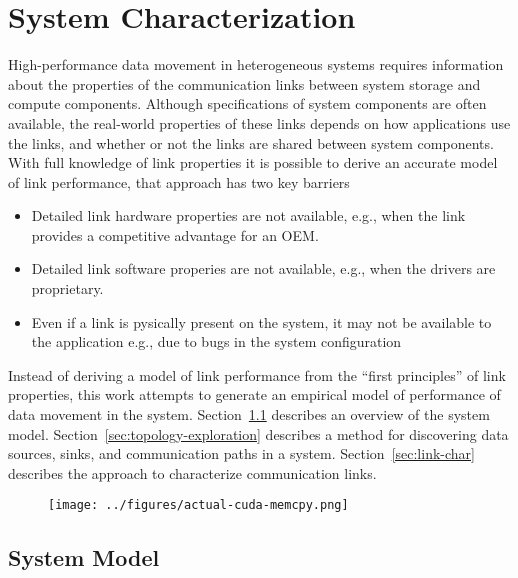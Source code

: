 \chapter{System Characterization}
\label{ch:sys-char}

High-performance data movement in heterogeneous systems requires information about the properties of the communication links between system storage and compute components.
Although specifications of system components are often available, the real-world properties of these links depends on how applications use the links, and whether or not the links are shared between system components.
With full knowledge of link properties it is possible to derive an accurate model of link performance, that approach has two key barriers
\begin{itemize}
    \item Detailed link hardware properties are not available, e.g., when the link provides a competitive advantage for an OEM.
    \item Detailed link software properies are not available, e.g., when the drivers are proprietary.
    \item Even if a link is pysically present on the system, it may not be available to the application {e.g., due to bugs in the system configuration}
\end{itemize}
Instead of deriving a model of link performance from the ``first principles'' of link properties, this work attempts to generate an empirical model of performance of data movement in the system.
Section~\ref{sec:system-model} describes an overview of the system model.
Section~\ref{sec:topology-exploration} describes a method for discovering data sources, sinks, and communication paths in a system.
Section~\ref{sec:link-char} describes the approach to characterize communication links.

\begin{figure}[h]
    \centering
    \texttt{[image: ../figures/actual-cuda-memcpy.png]}
    \caption[]{}
    \label{fig:actual-cuda-memcpy}
\end{figure}

\section{System Model}
\label{sec:system-model}

